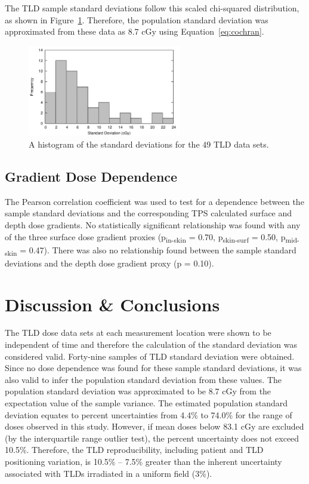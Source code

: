 The TLD sample standard deviations follow this scaled chi-squared distribution, as shown in Figure~\ref{fig:p5-stdev_histogram}. Therefore, the population standard deviation was approximated from these data as 8.7 cGy using Equation~\ref{eq:cochran}.

\begin{figure}
	\centering \includegraphics[width=0.6\textwidth]{figures/p5-stdev_histogram.png}
	\caption[A histogram of the standard deviations for the 49 TLD data sets]{\label{fig:p5-stdev_histogram}A histogram of the standard deviations for the 49 TLD data sets.}
\end{figure}

\subsection{Gradient Dose Dependence}
The Pearson correlation coefficient was used to test for a dependence between the sample standard deviations and the corresponding TPS calculated surface and depth dose gradients. No statistically significant relationship was found with any of the three surface dose gradient proxies (p\textsubscript{in-skin} = 0.70, p\textsubscript{skin-surf} = 0.50, p\textsubscript{mid-skin} = 0.47). There was also no relationship found between the sample standard deviations and the depth dose gradient proxy (p = 0.10).

\section{Discussion \& Conclusions}
The TLD dose data sets at each measurement location were shown to be independent of time and therefore the calculation of the standard deviation was considered valid. Forty-nine samples of TLD standard deviation were obtained. Since no dose dependence was found for these sample standard deviations, it was also valid to infer the population standard deviation from these values. The population standard deviation was approximated to be 8.7 cGy from the expectation value of the sample variance. The estimated population standard deviation equates to percent uncertainties from 4.4\% to 74.0\% for the range of doses observed in this study. However, if mean doses below 83.1 cGy are excluded (by the interquartile range outlier test), the percent uncertainty does not exceed 10.5\%. Therefore, the TLD reproducibility, including patient and TLD positioning variation, is 10.5\% -- 7.5\% greater than the inherent uncertainty associated with TLDs irradiated in a uniform field (3\%).

